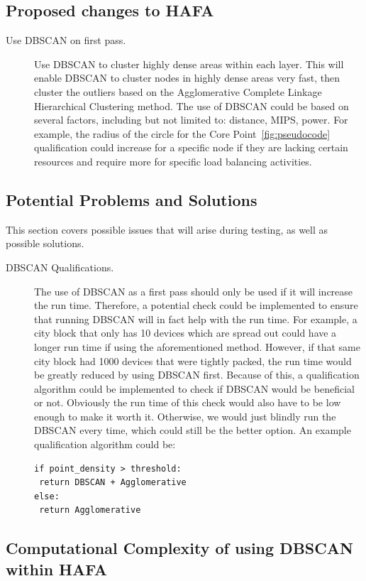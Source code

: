 \documentclass[letterpaper,twocolumn,10pt]{article}
\begin{document}
\subsection{Proposed changes to HAFA}
\begin{description}
\item[Use DBSCAN on first pass.] Use DBSCAN to cluster highly dense areas within each layer. This will enable DBSCAN to cluster nodes in highly dense areas very fast, then cluster the outliers based on the Agglomerative Complete Linkage Hierarchical Clustering method. The use of DBSCAN could be based on several factors, including but not limited to: distance, MIPS, power. For example, the radius of the circle for the Core Point~\ref{fig:pseudocode} qualification could increase for a specific node if they are lacking certain resources and require more for specific load balancing activities.
\end{description}

\subsection{Potential Problems and Solutions}
This section covers possible issues that will arise during testing, as well as possible solutions.
\begin{description}
\item[DBSCAN Qualifications.] The use of DBSCAN as a first pass should only be used if it will increase the run time. Therefore, a potential check could be implemented to ensure that running DBSCAN will in fact help with the run time. For example, a city block that only has 10 devices which are spread out could have a longer run time if using the aforementioned method. However, if that same city block had 1000 devices that were tightly packed, the run time would be greatly reduced by using DBSCAN first. Because of this, a qualification algorithm could be implemented to check if DBSCAN would be beneficial or not. Obviously the run time of this check would also have to be low enough to make it worth it. Otherwise, we would just blindly run the DBSCAN every time, which could still be the better option. An example qualification algorithm could be:
\begin{verbatim}
if point_density > threshold:
 return DBSCAN + Agglomerative
else:
 return Agglomerative
\end{verbatim}
\end{description}

\subsection{Computational Complexity of using DBSCAN within HAFA}
\end{document}
